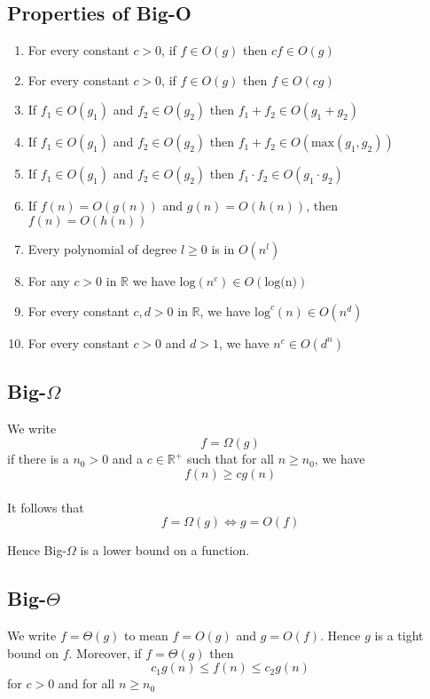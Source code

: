\documentclass{article}
\begin{document}
    \subsection{Properties of Big-O}
        \begin{enumerate}
            \item For every constant $c > 0$, if $f \in O(g)$ then $cf \in O(g)$
            \item For every constant $c > 0$, if $f \in O(g)$ then $f \in O(cg)$
            \item If $f_1 \in O(g_1)$ and $f_2 \in O(g_2)$ then $f_1 + f_2 \in O(g_1 + g_2)$
            \item If $f_1 \in O(g_1)$ and $f_2 \in O(g_2)$ then $f_1 + f_2 \in O(\text{max}(g_1, g_2))$
            \item If $f_1 \in O(g_1)$ and $f_2 \in O(g_2)$ then $f_1 \cdot f_2 \in O(g_1 \cdot g_2)$
            \item If $f(n) = O(g(n))$ and $ g(n) = O(h(n))$, then $f(n) = O(h(n))$
            \item Every polynomial of degree $l \geq 0$ is in $O(n^l)$
            \item For any $c > 0$ in $\mathbb{R}$ we have $\text{log}(n^c) \in O(\text{log(n)})$
            \item For every constant $c, d > 0$ in $\mathbb{R}$, we have $\text{log}^c(n) \in O(n^d)$
            \item For every constant $c > 0$ and $d > 1$, we have $n^c \in O(d^n)$
        \end{enumerate}
    \subsection{Big-$\Omega$}
        We write 
        \[ f = \Omega(g)  \]
        if there is a $n_0 > 0$ and a $c \in \mathbb{R}^+$ such that for all $n \geq n_0$, we have 
        \[ f(n) \geq cg(n) \]
        \\
        It follows that
        \[ f = \Omega (g) \iff g = O(f) \]
        
        Hence Big-$\Omega$ is a lower bound on a function.
    \subsection{Big-$\Theta$}
        We write $f = \Theta(g)$ to mean $f = O(g)$ and $g = O(f)$. Hence $g$ is a tight bound on $f$. Moreover, if $f = \Theta(g)$ then
        \[ c_1 g(n) \leq f(n) \leq c_2 g(n) \]
        for $c > 0$ and for all $n \geq n_0$
    
\end{document}
